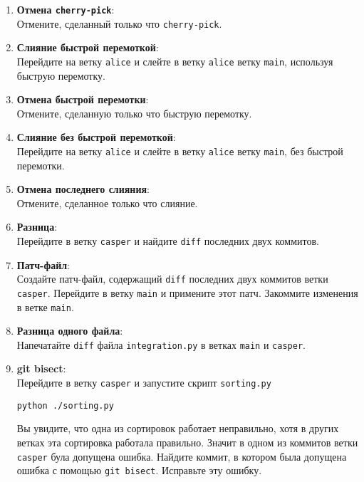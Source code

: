 \documentclass{article}
\begin{document}
\begin{enumerate}
\item \textbf{Отмена \texttt{cherry-pick}}:\\
Отмените, сделанный только что \texttt{cherry-pick}.

\item \textbf{Слияние быстрой перемоткой}:\\
Перейдите на ветку \texttt{alice} и слейте в ветку \texttt{alice} ветку \texttt{main}, используя быструю перемотку.

\item \textbf{Отмена быстрой перемотки}:\\
Отмените, сделанную только что быструю перемотку.

\item \textbf{Слияние без быстрой перемоткой}:\\
Перейдите на ветку \texttt{alice} и слейте в ветку \texttt{alice} ветку \texttt{main}, без быстрой перемотки.

\item \textbf{Отмена последнего слияния}:\\
Отмените, сделанное только что слияние.

\item \textbf{Разница}:\\
Перейдите в ветку \texttt{casper} и найдите \texttt{diff} последних двух коммитов.

\item \textbf{Патч-файл}:\\
Создайте патч-файл, содержащий \texttt{diff} последних двух коммитов ветки \texttt{casper}.
Перейдите в ветку \texttt{main} и примените этот патч. Закоммите изменения в ветке \texttt{main}.

\item \textbf{Разница одного файла}:\\
Напечатайте \texttt{diff} файла \texttt{integration.py} в ветках \texttt{main} и \texttt{casper}.

\item \textbf{git bisect}:\\
Перейдите в ветку \texttt{casper} и запустите скрипт \texttt{sorting.py}
\begin{lstlisting}
python ./sorting.py
\end{lstlisting}
Вы увидите, что одна из сортировок работает неправильно, хотя в других ветках эта сортировка работала правильно. Значит в одном из коммитов ветки \texttt{casper} була допущена ошибка. Найдите коммит, в котором была допущена ошибка с помощью \texttt{git bisect}. Исправьте эту ошибку.


\end{enumerate}
\end{document}
